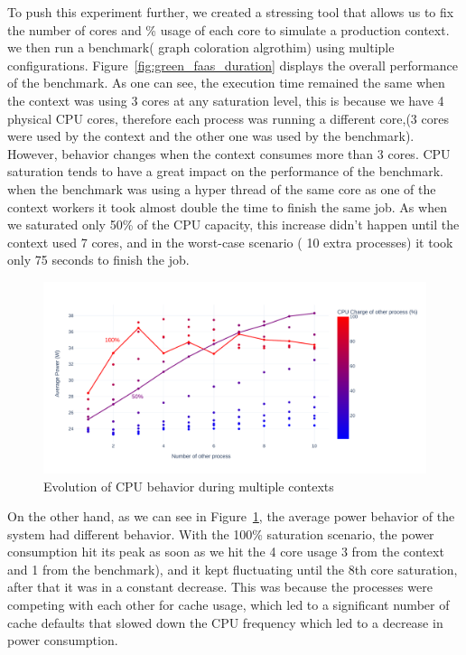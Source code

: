 To push this experiment further, we created a stressing tool that allows us to fix the number of cores and \% usage of each core to simulate a production context. we then run a benchmark( graph coloration algrothim) using multiple configurations.
Figure~\ref{fig:green_faas_duration} displays the overall performance of the benchmark. As one can see, the execution time remained the same when the context was using 3 cores at any saturation level,
this is because we have 4 physical CPU cores, therefore each process was running a different core,(3 cores were used by the context and the other one was used by the benchmark). However, behavior changes when the context consumes more than 3 cores. CPU saturation tends to have a great impact on the performance of the benchmark. when the benchmark was using a hyper thread of the same core as one of the context workers it took almost double the time to finish the same job.
As when we saturated only 50\% of the CPU capacity, this increase didn't happen until the context used 7 cores, and in the worst-case scenario ( 10 extra processes) it took only 75 seconds to finish the job.

\begin{figure}[!h]
      \centering
      \includegraphics[width=\linewidth]{chapters/green_faas_power}
      \caption{Evolution of CPU behavior during multiple contexts }
      \label{fig:green_faas_power}
\end{figure}

On the other hand, as we can see in Figure~\ref{fig:green_faas_power}, the average power behavior of the system had different behavior. With the 100\% saturation scenario, the power consumption hit its peak as soon as we hit the 4 core usage 3 from the context and 1 from the benchmark), and it kept fluctuating until the 8th core saturation, after that it was in a constant decrease. This was because the processes were competing with each other for cache usage, which led to a significant number of cache defaults that slowed down the CPU frequency which led to a decrease in power consumption.

